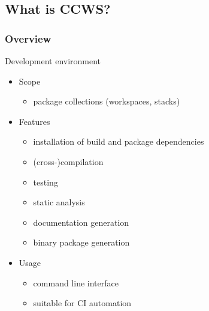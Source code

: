 \documentclass[hyperref={colorlinks=false, breaklinks=true},11pt]{beamer}
\begin{document}
\subsection{What is CCWS?}
\begin{frame}
    \frametitle{Overview}


    \begin{block}{Development environment}
        \begin{itemize}
            \item[] Scope
                \begin{itemize}
                    \item package collections (workspaces, stacks)
                \end{itemize}

            \item[] Features
                \begin{itemize}
                    \item installation of build and package dependencies
                    \item (cross-)compilation
                    \item testing
                    \item static analysis
                    \item documentation generation
                    \item binary package generation
                \end{itemize}

            \item[] Usage
                \begin{itemize}
                    \item command line interface
                    \item suitable for CI automation
                \end{itemize}
        \end{itemize}
    \end{block}
\end{frame}
\end{document}
